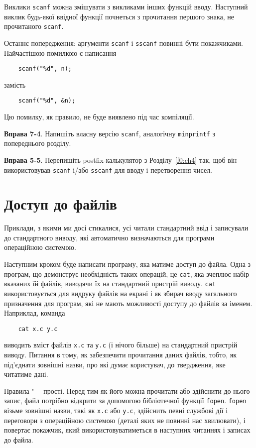 \documentclass[a4paper,12pt]{book}
\begin{document}
  Виклики \texttt{scanf} можна змішувати з викликами інших функцій вводу. Наступний виклик
  будь-якої ввідної функції почнеться з прочитання першого знака, не прочитаного
  \texttt{scanf}.

  Останнє попередження: аргументи \texttt{scanf} і \texttt{sscanf} повинні бути покажчиками.
  Найчастішою помилкою є написання
  \begin{verbatim}
    scanf("%d", n);
  \end{verbatim}
  замість
  \begin{verbatim}
    scanf("%d", &n);
  \end{verbatim}

  Цю помилку, як правило, не буде виявлено під час компіляції.

  \textbf{Вправа 7-4}. Напишіть власну версію \texttt{scanf}, аналогічну \texttt{minprintf}
  з попереднього розділу.

  \textbf{Вправа 5-5}. Перепишіть postfix-калькулятор з Розділу~\ref{f0:ch4} так,
  щоб він використовував \texttt{scanf} і/або \texttt{sscanf} для вводу і перетворення
  чисел.

\section{Доступ до файлів}


  Приклади, з якими ми досі стикалися, усі читали стандартний ввід і записували до
  стандартного виводу, які автоматично визначаються для програми операційною
  системою.

  Наступним кроком буде написати програму, яка матиме доступ до файла. Одна з програм, що
  демонструє необхідність таких операцій, це \texttt{cat}, яка зчеплює набір вказаних їй
  файлів, виводячи їх на стандартний пристрій виводу. \texttt{cat} використовується для
  видруку файлів на екрані і як збирач вводу загального призначення для програм, які не
  мають можливості доступу до файлів за іменем. Наприклад, команда
  \begin{verbatim}
    cat x.c y.c
  \end{verbatim}

  виводить вміст файлів \texttt{x.c} та \texttt{y.c} (і нічого більше) на стандартний
  пристрій виводу. Питання в тому, як забезпечити прочитання даних файлів, тобто, як
  під'єднати зовнішні назви, про які думає користувач, до твердження, яке читатиме дані.

  Правила "--- прості. Перед тим як його можна прочитати або здійснити до нього запис,
  файл потрібно відкрити за допомогою бібліотечної функції \texttt{fopen}. \texttt{fopen}
  візьме зовнішні назви, такі як \texttt{x.c} або \texttt{y.c}, здійснить певні службові
  дії і переговори з операційною системою (деталі яких не повинні нас хвилювати), і
  повертає покажчик, який використовуватиметься в наступних читаннях і записах до файла.
\end{document}
